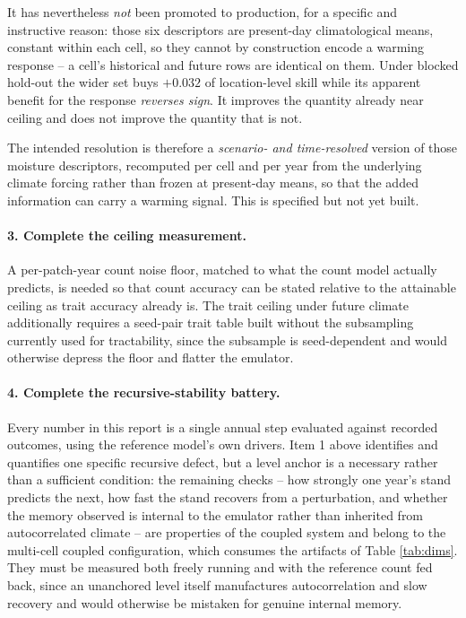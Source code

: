 \documentclass[11pt]{article}
\begin{document}
It has nevertheless \emph{not} been promoted to production, for a specific and instructive reason: those six descriptors are present-day climatological means, constant within each cell, so they cannot by construction encode a warming response -- a cell's historical and future rows are identical on them. Under blocked hold-out the wider set buys $+0.032$ of location-level skill while its apparent benefit for the response \emph{reverses sign}. It improves the quantity already near ceiling and does not improve the quantity that is not.

The intended resolution is therefore a \emph{scenario- and time-resolved} version of those moisture descriptors, recomputed per cell and per year from the underlying climate forcing rather than frozen at present-day means, so that the added information can carry a warming signal. This is specified but not yet built.

\paragraph{3. Complete the ceiling measurement.}
A per-patch-year count noise floor, matched to what the count model actually predicts, is needed so that count accuracy can be stated relative to the attainable ceiling as trait accuracy already is. The trait ceiling under future climate additionally requires a seed-pair trait table built without the subsampling currently used for tractability, since the subsample is seed-dependent and would otherwise depress the floor and flatter the emulator.

\paragraph{4. Complete the recursive-stability battery.}
Every number in this report is a single annual step evaluated against recorded outcomes, using the reference model's own drivers. Item 1 above identifies and quantifies one specific recursive defect, but a level anchor is a necessary rather than a sufficient condition: the remaining checks -- how strongly one year's stand predicts the next, how fast the stand recovers from a perturbation, and whether the memory observed is internal to the emulator rather than inherited from autocorrelated climate -- are properties of the coupled system and belong to the multi-cell coupled configuration, which consumes the artifacts of Table \ref{tab:dims}. They must be measured both freely running and with the reference count fed back, since an unanchored level itself manufactures autocorrelation and slow recovery and would otherwise be mistaken for genuine internal memory.
\end{document}
